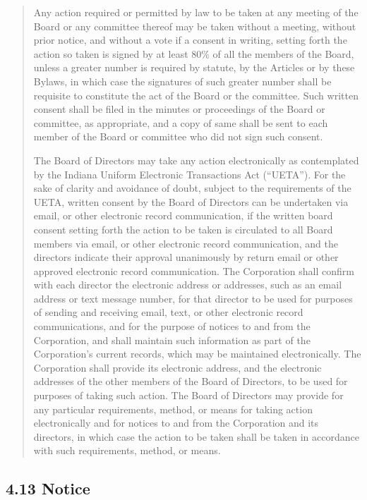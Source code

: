 \documentclass[
]{book}
\begin{document}
\begin{quote}
Any action required or permitted by law to be taken at any meeting of
the Board or any committee thereof may be taken without a meeting,
without prior notice, and without a vote if a consent in writing,
setting forth the action so taken is signed by at least 80\% of all the
members of the Board, unless a greater number is required by statute,
by the Articles or by these Bylaws, in which case the signatures of
such greater number shall be requisite to constitute the act of the
Board or the committee. Such written consent shall be filed in the
minutes or proceedings of the Board or committee, as appropriate, and
a copy of same shall be sent to each member of the Board or committee
who did not sign such consent.

The Board of Directors may take any action electronically as
contemplated by the Indiana Uniform Electronic Transactions Act
(``UETA''). For the sake of clarity and avoidance of doubt, subject to
the requirements of the UETA, written consent by the Board of
Directors can be undertaken via email, or other electronic record
communication, if the written board consent setting forth the action
to be taken is circulated to all Board members via email, or other
electronic record communication, and the directors indicate their
approval unanimously by return email or other approved electronic
record communication. The Corporation shall confirm with each director
the electronic address or addresses, such as an email address or text
message number, for that director to be used for purposes of sending
and receiving email, text, or other electronic record communications,
and for the purpose of notices to and from the Corporation, and shall
maintain such information as part of the Corporation's current
records, which may be maintained electronically. The Corporation shall
provide its electronic address, and the electronic addresses of the
other members of the Board of Directors, to be used for purposes of
taking such action. The Board of Directors may provide for any
particular requirements, method, or means for taking action
electronically and for notices to and from the Corporation and its
directors, in which case the action to be taken shall be taken in
accordance with such requirements, method, or means.
\end{quote}

\subsection{4.13 Notice}\label{notice}
\end{document}

